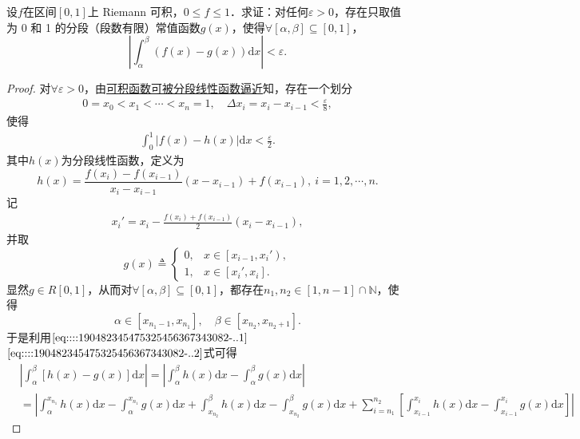 \documentclass[../../main.tex]{subfiles}%
\begin{document}
\begin{example}
设\( f \)在区间\( [0,1] \)上 Riemann 可积，\( 0 \leqslant f \leqslant 1 \)．求证：对任何\( \varepsilon > 0 \)，存在只取值为 0 和 1 的分段（段数有限）常值函数\( g(x) \)，使得\( \forall [\alpha, \beta] \subseteq [0,1] \)，
\[
\left| \int_{\alpha}^{\beta} (f(x) - g(x)) \mathrm{d}x \right| < \varepsilon.
\]
\end{example}
\begin{proof}

对\(\forall \varepsilon > 0\)，由\hyperref[theorem:可积被连续函数逼近]{可积函数可被分段线性函数逼近}知，存在一个划分
\begin{align}
0 = x_0 < x_1 < \cdots < x_n = 1, \quad \Delta x_i = x_i - x_{i-1} < \frac{\varepsilon}{8}, \label{eq::::190482345475325456367343082-..1}
\end{align}
使得
\begin{align}
\int_0^1 \left| f(x) - h(x) \right| \mathrm{d}x < \frac{\varepsilon}{2}. \label{eq::::190482345475325456367343082-..3}
\end{align}
其中\( h(x) \)为分段线性函数，定义为
\[
h(x) = \frac{f(x_i) - f(x_{i-1})}{x_i - x_{i-1}} \left( x - x_{i-1} \right) + f(x_{i-1}), \ i = 1,2,\cdots,n.
\]
记
\begin{align}
x_i' = x_i - \frac{f(x_i) + f(x_{i-1})}{2} \left( x_i - x_{i-1} \right), \label{eq::::190482345475325456367343082-..2}
\end{align}
并取
\[
g(x) \triangleq \begin{cases}
0, & x \in \left[ x_{i-1}, x_i' \right), \\
1, & x \in \left[ x_i', x_i \right].
\end{cases}
\]
显然\( g \in R[0,1] \)，从而对\(\forall [\alpha, \beta] \subseteq [0,1] \)，都存在\( n_1, n_2 \in [1, n-1] \cap \mathbb{N} \)，使得
\[
\alpha \in \left[ x_{n_1 - 1}, x_{n_1} \right], \quad \beta \in \left[ x_{n_2}, x_{n_2 + 1} \right].
\]
于是利用\(\eqref{eq::::190482345475325456367343082-..1}\)\(\eqref{eq::::190482345475325456367343082-..2}\)式可得
\begin{align*}
&\left| \int_{\alpha}^{\beta}{\left[ h\left( x \right) -g\left( x \right) \right] \mathrm{d}x} \right|=\left| \int_{\alpha}^{\beta}{h\left( x \right) \mathrm{d}x}-\int_{\alpha}^{\beta}{g\left( x \right) \mathrm{d}x} \right|
\\
&=\left| \int_{\alpha}^{x_{n_1}}{h\left( x \right) \mathrm{d}x}-\int_{\alpha}^{x_{n_1}}{g\left( x \right) \mathrm{d}x}+\int_{x_{n_2}}^{\beta}{h\left( x \right) \mathrm{d}x}-\int_{x_{n_2}}^{\beta}{g\left( x \right) \mathrm{d}x}+\sum_{i=n_1}^{n_2}{\left[ \int_{x_{i-1}}^{x_i}{h\left( x \right) \mathrm{d}x}-\int_{x_{i-1}}^{x_i}{g\left( x \right) \mathrm{d}x} \right]} \right|

\end{align*}
\end{proof}
\end{document}
